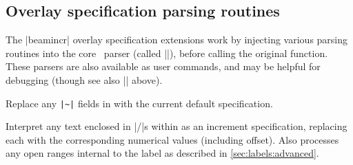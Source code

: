 \documentclass[a4paper]{ltxdoc}
\begin{document}
\subsection{Overlay specification parsing routines}

The |beamincr| overlay specification extensions work by injecting various
parsing routines into the core \beamer\ parser (called |\beamer@masterdecode|),
before calling the original function.  These parsers are also available as user
commands, and may be helpful for debugging (though see also |\beamincrdebug|
above).  

\begin{command}{\parsedefincspec {}}
  Replace any \texttt{|\~{}|} fields in  with the current
  default specification.
\end{command}
  
\begin{command}{\parseincrspec {}}
  Interpret any text enclosed in |/|s within  as an increment
  specification, replacing each with the corresponding numerical values
  (including offset).  Also processes any open ranges internal to the label as
  described in \cref{sec:labels:advanced}.
\end{command}

\begin{command}{\parseresetspec {}}
\end{command}

\begin{command}{\parselabelspec {}}
\end{command}




%




%  
% 
\end{document}
